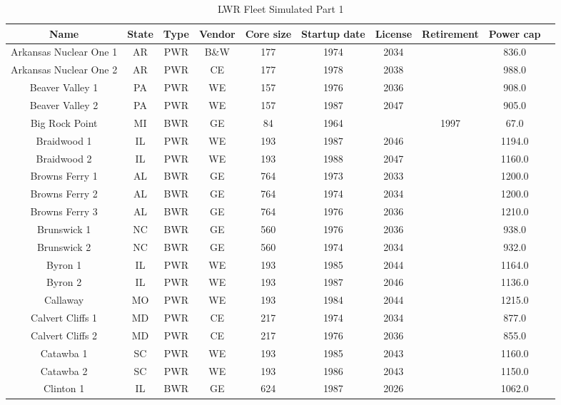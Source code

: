 \begin{table}[h!]
    \centering
    \caption{LWR Fleet Simulated Part 1}
    \label{tab:lwr_fleet_1}
    \begin{tabular}{c c c c c c c c c c}
    \hline
    \textbf{Name} & \textbf{State} & \textbf{Type} & \textbf{Vendor} & \textbf{Core size} & \textbf{Startup date} & \textbf{License} & \textbf{Retirement} & \textbf{Power cap} \\
    \hline
    Arkansas Nuclear One 1 & AR & PWR & B\&W & 177 & 1974 & 2034 &  & 836.0 \\
    Arkansas Nuclear One 2 & AR & PWR & CE & 177 & 1978 & 2038 &  & 988.0 \\
    Beaver Valley 1 & PA & PWR & WE & 157 & 1976 & 2036 &  & 908.0 \\
    Beaver Valley 2 & PA & PWR & WE & 157 & 1987 & 2047 &  & 905.0 \\
    Big Rock Point & MI & BWR & GE & 84 & 1964 &  & 1997 & 67.0 \\
    Braidwood 1 & IL & PWR & WE & 193 & 1987 & 2046 &  & 1194.0 \\
    Braidwood 2 & IL & PWR & WE & 193 & 1988 & 2047 &  & 1160.0 \\
    Browns Ferry 1 & AL & BWR & GE & 764 & 1973 & 2033 &  & 1200.0 \\
    Browns Ferry 2 & AL & BWR & GE & 764 & 1974 & 2034 &  & 1200.0 \\
    Browns Ferry 3 & AL & BWR & GE & 764 & 1976 & 2036 &  & 1210.0 \\
    Brunswick 1 & NC & BWR & GE & 560 & 1976 & 2036 &  & 938.0 \\
    Brunswick 2 & NC & BWR & GE & 560 & 1974 & 2034 &  & 932.0 \\
    Byron 1 & IL & PWR & WE & 193 & 1985 & 2044 &  & 1164.0 \\
    Byron 2 & IL & PWR & WE & 193 & 1987 & 2046 &  & 1136.0 \\
    Callaway & MO & PWR & WE & 193 & 1984 & 2044 &  & 1215.0 \\
    Calvert Cliffs 1 & MD & PWR & CE & 217 & 1974 & 2034 &  & 877.0 \\
    Calvert Cliffs 2 & MD & PWR & CE & 217 & 1976 & 2036 &  & 855.0 \\
    Catawba 1 & SC & PWR & WE & 193 & 1985 & 2043 &  & 1160.0 \\
    Catawba 2 & SC & PWR & WE & 193 & 1986 & 2043 &  & 1150.0 \\
    Clinton 1 & IL & BWR & GE & 624 & 1987 & 2026 &  & 1062.0 \\

\end{tabular}
\end{table}
